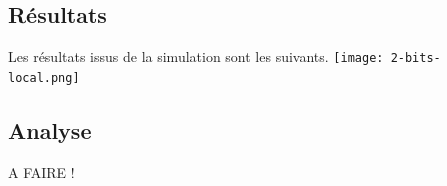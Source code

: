 \documentclass[a4paper]{article}
\begin{document}
\subsection{Résultats}

Les résultats issus de la simulation sont les suivants.
\texttt{[image: 2-bits-local.png]}

\subsection{Analyse}

A FAIRE !
\end{document}
